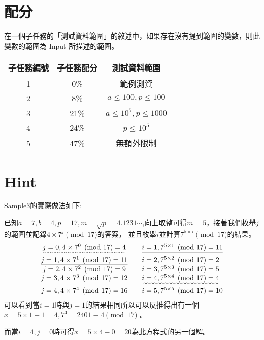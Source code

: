 \documentclass[11pt,a4paper]{article}
\begin{document}
\section*{配分}

在一個子任務的「測試資料範圍」的敘述中，如果存在沒有提到範圍的變數，則此變數的範圍為 Input 所描述的範圍。

\begin{center}
 \begin{tabular}{||c c c||} 
 \hline
 子任務編號 & 子任務配分 & 測試資料範圍 \\  
 \hline\hline
 1 & 0\% & 範例測資 \\ 
 \hline
 2 & 8\% & $a \le  100,p \le 100$ \\
 \hline
 3 & 21\% & $a \le  10^5,p \le 1000$ \\
 \hline
 4 & 24\% & $p \le 10^5$ \\
 \hline
 5 & 47\% & 無額外限制 \\
 \hline
\end{tabular}
\end{center}

\section*{Hint}

Sample3的實際做法如下:

已知$a = 7 ,b = 4 ,p = 17 , m =\sqrt p = 4.1231\cdots$,向上取整可得$m = 5$，接著我們枚舉$j$的範圍並記錄$4 \times 7^{j} \pmod{17}$的答案，
並且枚舉$i$並計算$7^ {5 \times i} \pmod {17}$的結果。
$$
\begin{array}{clcr}
	\uwave{j = 0 ,4 \times 7^{0} \pmod{17} = 4} \quad &  \underline{i = 1 ,7^{5 \times 1} \pmod{17} = 11}  \\
	\underline{j = 1 ,4 \times 7^{1} \pmod{17} = 11} \quad &  i = 2 ,7^{5 \times 2} \pmod{17} = 2 \\
	j = 2 ,4 \times 7^{2} \pmod{17} = 9 \quad &  i = 3 ,7^{5 \times 3} \pmod{17} = 5 \\
	j = 3 ,4 \times 7^{3} \pmod{17} = 12 \quad & \uwave{i = 4 ,7^{5 \times 4} \pmod{17} = 4 } \\
	j = 4 ,4 \times 7^{4} \pmod{17} = 16 \quad &  i = 5 ,7^{5 \times 5} \pmod{17} = 10 \\
\end{array}
$$
可以看到當$i = 1$時與$j = 1$的結果相同所以可以反推得出有一個$x = 5 \times 1 - 1 = 4 , 7^ {4} = 2401 \equiv 4 \pmod {17}$ 。

而當$i = 4, j = 0$時可得$x = 5 \times 4 - 0 = 20$為此方程式的另一個解。
\end{document}
